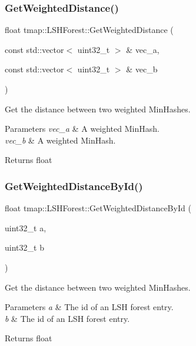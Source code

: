 \subsubsection{\texorpdfstring{Get\+Weighted\+Distance()}{GetWeightedDistance()}}
{\footnotesize\ttfamily float tmap\+::\+L\+S\+H\+Forest\+::\+Get\+Weighted\+Distance (\begin{DoxyParamCaption}\item[{const std\+::vector$<$ uint32\+\_\+t $>$ \&}]{vec\+\_\+a,  }\item[{const std\+::vector$<$ uint32\+\_\+t $>$ \&}]{vec\+\_\+b }\end{DoxyParamCaption})}



Get the distance between two weighted Min\+Hashes. 


\begin{DoxyParams}{Parameters}
{\em vec\+\_\+a} & A weighted Min\+Hash. \\
\hline
{\em vec\+\_\+b} & A weighted Min\+Hash. \\
\hline
\end{DoxyParams}
\begin{DoxyReturn}{Returns}
float 
\end{DoxyReturn}
\mbox{\label{classtmap_1_1LSHForest_ab00052289bb6bea152e6024049eebcc5}} 
\subsubsection{\texorpdfstring{Get\+Weighted\+Distance\+By\+Id()}{GetWeightedDistanceById()}}
{\footnotesize\ttfamily float tmap\+::\+L\+S\+H\+Forest\+::\+Get\+Weighted\+Distance\+By\+Id (\begin{DoxyParamCaption}\item[{uint32\+\_\+t}]{a,  }\item[{uint32\+\_\+t}]{b }\end{DoxyParamCaption})}



Get the distance between two weighted Min\+Hashes. 


\begin{DoxyParams}{Parameters}
{\em a} & The id of an L\+SH forest entry. \\
\hline
{\em b} & The id of an L\+SH forest entry. \\
\hline
\end{DoxyParams}
\begin{DoxyReturn}{Returns}
float 
\end{DoxyReturn}
\mbox{\label{classtmap_1_1LSHForest_a7785c1a7f17eddd5e943db4b5d6d7cf2}} 
